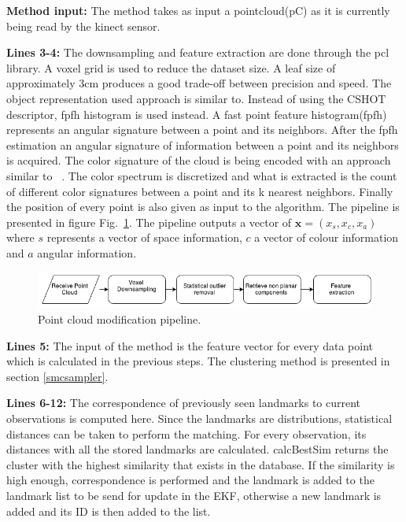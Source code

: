\documentclass[twoside,hidelinks]{article}
\begin{document}
\textbf{Method input:} The method takes as input a pointcloud(pC) as it is currently being read by the kinect sensor.

\textbf{Lines 3-4:} The downsampling and feature extraction are done through the pcl\cite{pcl} library. A voxel grid is used to reduce the dataset size. A leaf size of approximately 3cm produces a good trade-off between precision and speed. The object representation used approach is similar to\cite{objectpointSLAM}. Instead of using the CSHOT descriptor, fpfh\cite{fpfh} histogram is used instead. A fast point feature histogram(fpfh) represents an angular signature between a point and its neighbors. After the fpfh estimation an angular signature of information between a point and its neighbors is acquired. The color signature of the cloud is being encoded with an approach similar to ~\cite{smcddp}. The color spectrum is discretized and what is extracted is the count of different color signatures between a point and its k nearest neighbors. Finally the position of every point is also given as input to the algorithm. The pipeline is presented in figure Fig.~\ref{pcl:mod}. The pipeline outputs a vector of $ \textbf{x} = (x_s, x_c, x_a) $  where $s$ represents a vector of space information, $c$ a vector of colour information and $a$ angular information. 

\begin{figure}[ht!]
  \centering
    \includegraphics[width=1\textwidth]{Basic}
  \caption{Point cloud modification pipeline.}
  \label{pcl:mod}
\end{figure}

\textbf{Lines 5:} The input of the method is the feature vector for every data point which is calculated in the previous steps. The clustering method is presented in section \ref{smcsampler}. 

\textbf{Lines 6-12:} The correspondence of previously seen landmarks to current observations is computed here. Since the landmarks are distributions, statistical distances can be taken to perform the matching. For every observation, its distances with all the stored landmarks are calculated. calcBestSim returns the cluster with the highest similarity that exists in the database. If the similarity is high enough, correspondence is performed and the landmark is added to the landmark list to be send for update in the EKF, otherwise a new landmark is added and its ID is then added to the list.
\end{document}
